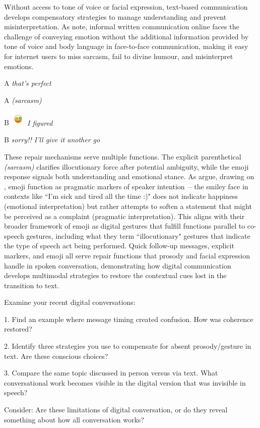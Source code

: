 Without access to tone of voice or facial expression, text-based communication develops compensatory strategies to manage understanding and prevent misinterpretation. As \citet{gawne2019emoji} note, informal written communication online faces the challenge of conveying emotion without the additional information provided by tone of voice and body language in face-to-face communication, making it easy for internet users to miss sarcasm, fail to divine humour, and misinterpret emotions.
\ea
\begin{dialogue}
\item[A] \textit{that's perfect}
\item[A] \textit{(sarcasm)}
\item[B] \textit{\includegraphics[width=0.7cm]{figures/emoji.png} I figured}
\item[B] \textit{sorry!! I'll give it another go}
\end{dialogue}
\z

These repair mechanisms serve multiple functions. The explicit parenthetical \textit{(sarcasm)} clarifies illocutionary force after potential ambiguity, while the emoji response signals both understanding and emotional stance. As \citet{gawne2019emoji} argue, drawing on \citet{dresner2010functions}, emoji function as pragmatic markers of speaker intention~-- the smiley face in contexts like ``I'm sick and tired all the time :)" does not indicate happiness (emotional interpretation) but rather attempts to soften a statement that might be perceived as a complaint (pragmatic interpretation).
This aligns with their broader framework of emoji as digital gestures that fulfill functions parallel to co-speech gestures, including what they term ``illocutionary" gestures that indicate the type of speech act being performed. Quick follow-up messages, explicit markers, and emoji all serve repair functions that prosody and facial expression handle in spoken conversation, demonstrating how digital communication develops multimodal strategies to restore the contextual cues lost in the transition to text.

\begin{tcolorbox}[title=Exercise: Digital Transformations, colback=white, colframe=teal!75!black, fonttitle=\bfseries]
Examine your recent digital conversations:

1. Find an example where message timing created confusion. How was coherence restored?

2. Identify three strategies you use to compensate for absent prosody/gesture in text. Are these conscious choices?

3. Compare the same topic discussed in person versus via text. What conversational work becomes visible in the digital version that was invisible in speech?

Consider: Are these limitations of digital conversation, or do they reveal something about how all conversation works?
\end{tcolorbox}

